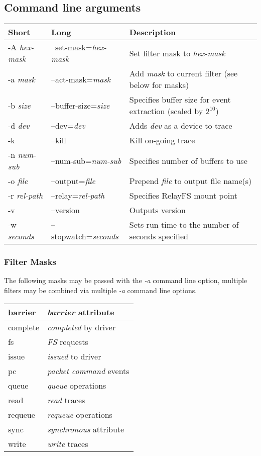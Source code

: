 \documentclass{article}
\begin{document}
\subsection{\label{sec:blktrace-args}Command line arguments}
\begin{tabular}{|l|l|l|}\hline
Short              & Long                       & Description \\ \hline\hline
-A \emph{hex-mask} & --set-mask=\emph{hex-mask} & Set filter mask to \emph{hex-mask} \\ \hline
-a \emph{mask}     & --act-mask=\emph{mask}     & Add \emph{mask} to current filter (see below for masks) \\ \hline
-b \emph{size}     & --buffer-size=\emph{size}  & Specifies buffer size for event extraction (scaled by $2^{10}$) \\ \hline
-d \emph{dev}      & --dev=\emph{dev}           & Adds \emph{dev} as a device to trace \\ \hline
-k                 & --kill                     & Kill on-going trace \\ \hline
-n \emph{num-sub}  & --num-sub=\emph{num-sub}   & Specifies number of buffers to use \\ \hline
-o \emph{file}     & --output=\emph{file}       & Prepend \emph{file} to output file name(s) \\ \hline
-r \emph{rel-path} & --relay=\emph{rel-path}    & Specifies RelayFS mount point \\ \hline
-v                 & --version                  & Outputs version \\ \hline
-w \emph{seconds}  & --stopwatch=\emph{seconds} & Sets run time to the number of seconds specified \\ \hline
\end{tabular}

\subsubsection{\label{sec:filter-mask}Filter Masks}
The following masks may be passed with the \emph{-a} command line
option, multiple filters may be combined via multiple \emph{-a} command
line options.\smallskip

\begin{tabular}{|l|l|}\hline
barrier & \emph{barrier} attribute \\ \hline
complete & \emph{completed} by driver \\ \hline
fs & \emph{FS} requests \\ \hline
issue & \emph{issued} to driver \\ \hline
pc & \emph{packet command} events \\ \hline
queue & \emph{queue} operations \\ \hline
read & \emph{read} traces \\ \hline
requeue & \emph{requeue} operations \\ \hline
sync & \emph{synchronous} attribute \\ \hline
write & \emph{write} traces \\ \hline
\end{tabular}
\end{document}
